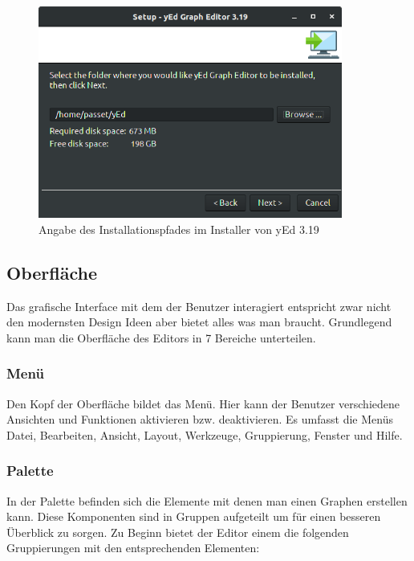 \begin{figure}[!h]
	\begin{center}
		\includegraphics[width=10cm]{images/yed_installation_pfad.png}
		\caption{Angabe des Installationspfades im Installer von yEd 3.19}
		\label{yEdInstaller}
	\end{center}
\end{figure}

\subsection{Oberfläche}
\prc

\noindent
Das grafische Interface mit dem der Benutzer interagiert entspricht zwar nicht den modernsten Design Ideen aber bietet alles was man braucht. Grundlegend kann man die Oberfläche des Editors in 7 Bereiche unterteilen.

\subsubsection{Menü}

Den Kopf der Oberfläche bildet das Menü. Hier kann der Benutzer verschiedene Ansichten und Funktionen aktivieren bzw. deaktivieren. Es umfasst die Menüs Datei, Bearbeiten, Ansicht, Layout, Werkzeuge, Gruppierung, Fenster und Hilfe.

\subsubsection{Palette}

\noindent
In der Palette befinden sich die Elemente mit denen man einen Graphen erstellen kann. Diese Komponenten sind in Gruppen aufgeteilt um für einen besseren Überblick zu sorgen. Zu Beginn bietet der Editor einem die folgenden Gruppierungen mit den entsprechenden Elementen:
\\

